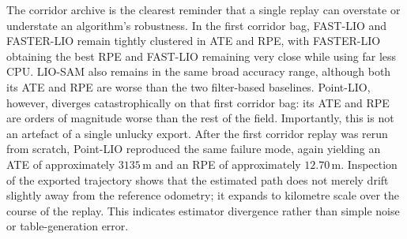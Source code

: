 \documentclass[12pt,a4paper]{report}
\begin{document}
\begin{table}[H]
\centering
\small
\caption{Corridor static rosbag results.}
\label{tab:static-corridor}
\setlength{\tabcolsep}{4pt}
\renewcommand{\arraystretch}{1.05}
\end{table}

The corridor archive is the clearest reminder that a single replay can overstate or understate an algorithm's robustness. In the first corridor bag, FAST-LIO and FASTER-LIO remain tightly clustered in ATE and RPE, with FASTER-LIO obtaining the best RPE and FAST-LIO remaining very close while using far less CPU. LIO-SAM also remains in the same broad accuracy range, although both its ATE and RPE are worse than the two filter-based baselines. Point-LIO, however, diverges catastrophically on that first corridor bag: its ATE and RPE are orders of magnitude worse than the rest of the field. Importantly, this is not an artefact of a single unlucky export. After the first corridor replay was rerun from scratch, Point-LIO reproduced the same failure mode, again yielding an ATE of approximately \(3135\,\mathrm{m}\) and an RPE of approximately \(12.70\,\mathrm{m}\). Inspection of the exported trajectory shows that the estimated path does not merely drift slightly away from the reference odometry; it expands to kilometre scale over the course of the replay. This indicates estimator divergence rather than simple noise or table-generation error.
\end{document}
